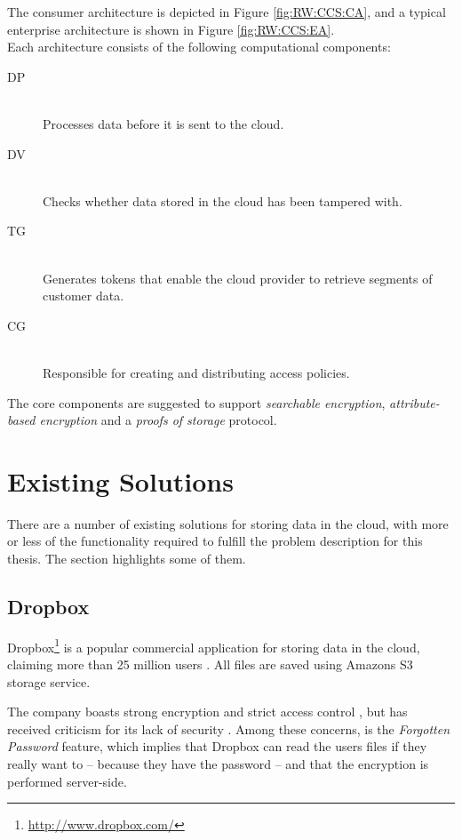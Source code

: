 \documentclass[pdftex,english,10pt,b5paper,twoside]{book}
\begin{document}
The consumer architecture is depicted in Figure \ref{fig:RW:CCS:CA}, and a typical
enterprise architecture is shown in Figure \ref{fig:RW:CCS:EA}.\\

\noindent Each architecture consists of the following computational components:
\begin{description}
  \item[\ac{DP}] \hfill \\Processes data before it is sent to the cloud.
  \item[\ac{DV}] \hfill \\Checks whether data stored in the cloud has been
  tampered with.
  \item[\ac{TG}] \hfill \\Generates tokens that enable the cloud provider to
  retrieve segments of customer data.
  \item[\ac{CG}] \hfill \\Responsible for creating and distributing access
  policies.
\end{description}

The core components are suggested to support \emph{searchable encryption},
\emph{attribute-based encryption} and a \emph{proofs of storage} protocol.

\section{Existing Solutions}
\label{sec:existing}

There are a number of existing solutions for storing data in the cloud,
with more or less of the functionality required to fulfill the problem
description for this thesis. The section highlights some of them.

\subsection{Dropbox}

Dropbox\footnote{\url{http://www.dropbox.com/}} is a popular commercial
application for storing data in the cloud, claiming more than 25 million users
\cite{dropbox_users}. All files are saved using Amazons S3 storage service.

The company boasts strong encryption and strict access control
\cite{dropbox_security}, but has received criticism for its lack of security
\cite{dropbox_concerns}. Among these concerns, is the \emph{Forgotten Password}
feature, which implies that Dropbox can read the users files if they really
want to -- because they have the password -- and that the encryption is
performed server-side.
\end{document}
